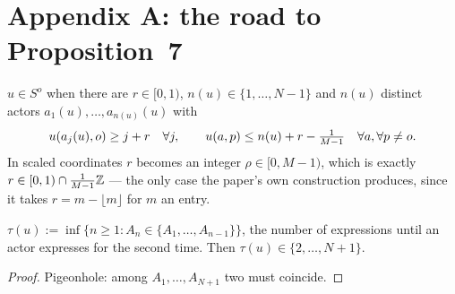 \chapter{Appendix A: the road to Proposition~7}

\begin{definition}
  \label{def5-favouring}
  \leanok
  $u \in S^o$ when there are $r \in [0,1)$, $n(u) \in \{1, \dots, N-1\}$ and
  $n(u)$ distinct actors $a_1(u), \dots, a_{n(u)}(u)$ with
  \[
    u(a_j(u), o) \ge j + r \quad \forall j, \qquad
    u(a,p) \le n(u) + r - \tfrac{1}{M-1} \quad \forall a, \forall p \ne o .
  \]
  In scaled coordinates $r$ becomes an integer $\rho \in [0, M-1)$, which is
  exactly $r \in [0,1) \cap \tfrac{1}{M-1}\mathbb{Z}$ — the only case the paper's own
  construction produces, since it takes $r = m - \lfloor m \rfloor$ for $m$ an
  entry.
\end{definition}

\begin{definition}
  \label{def5-repeat}
  \leanok
  $\tau(u) := \inf\{ n \ge 1 : A_n \in \{A_1, \dots, A_{n-1}\} \}$, the number of
  expressions until an actor expresses for the second time.  Then
  $\tau(u) \in \{2, \dots, N+1\}$.
\end{definition}
\begin{proof}
  \leanok
  Pigeonhole: among $A_1, \dots, A_{N+1}$ two must coincide.
\end{proof}

